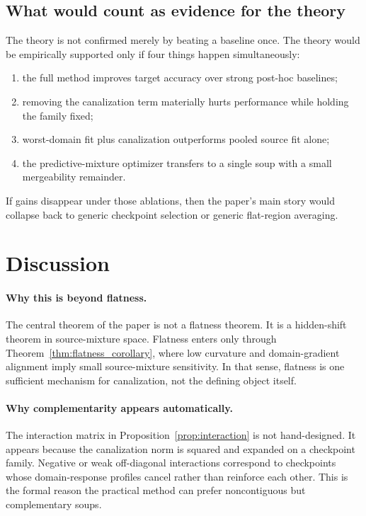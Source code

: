 \documentclass{article}
\theoremstyle{definition}
\begin{document}
\subsection{What would count as evidence for the theory}

The theory is not confirmed merely by beating a baseline once. The theory would be empirically supported only if four things happen simultaneously:
\begin{enumerate}[leftmargin=1.3em]
    \item the full method improves target accuracy over strong post-hoc baselines;
    \item removing the canalization term materially hurts performance while holding the family fixed;
    \item worst-domain fit plus canalization outperforms pooled source fit alone;
    \item the predictive-mixture optimizer transfers to a single soup with a small mergeability remainder.
\end{enumerate}
If gains disappear under those ablations, then the paper's main story would collapse back to generic checkpoint selection or generic flat-region averaging.

\section{Discussion}
\label{sec:discussion}

\paragraph{Why this is beyond flatness.}
The central theorem of the paper is not a flatness theorem. It is a hidden-shift theorem in source-mixture space. Flatness enters only through Theorem~\ref{thm:flatness_corollary}, where low curvature and domain-gradient alignment imply small source-mixture sensitivity. In that sense, flatness is one sufficient mechanism for canalization, not the defining object itself.

\paragraph{Why complementarity appears automatically.}
The interaction matrix in Proposition~\ref{prop:interaction} is not hand-designed. It appears because the canalization norm is squared and expanded on a checkpoint family. Negative or weak off-diagonal interactions correspond to checkpoints whose domain-response profiles cancel rather than reinforce each other. This is the formal reason the practical method can prefer noncontiguous but complementary soups.
\end{document}
